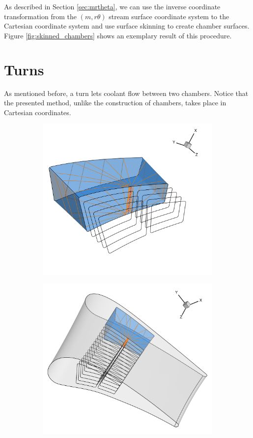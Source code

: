 \documentclass[a4paper, 11pt]{report}
\theoremstyle{definition}
\begin{document}
	As described in Section \ref{sec:mrtheta}, we can use the inverse coordinate transformation from the $(m, r\theta)$ stream surface coordinate system to the Cartesian coordinate system and use surface skinning to create chamber surfaces. Figure \ref{fig:skinned_chambers} shows an exemplary result of this procedure.

\section{Turns}
	As mentioned before, a turn lets coolant flow between two chambers. Notice that the presented method, unlike the construction of chambers, takes place in Cartesian coordinates.

	\begin{figure}[H]
		\centering
		\begin{subfigure}{.62\textwidth}
			\includegraphics[width=\textwidth]{../tec/channel/11.png}
		\end{subfigure}
		\begin{subfigure}{.37\textwidth}
			\includegraphics[width=\textwidth]{../tec/channel/12.png}

\end{subfigure}
\end{figure}
\end{document}
